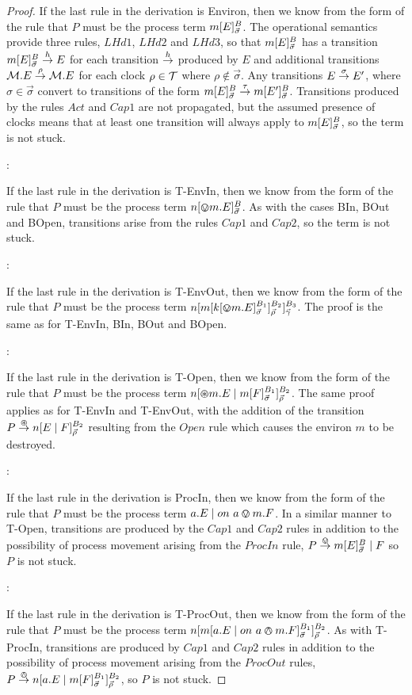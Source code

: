 \begin{proof}
\noindent If the last rule in the derivation is Environ, then we know
from the form of the rule that $P$ must be the process term
${m}[ E ]^{B}_{\vec{\sigma}}$.  The operational semantics provide
three rules, $LHd1$, $LHd2$ and $LHd3$, so that
${m}[ E ]^{B}_{\vec{\sigma}}$ has a transition
${m}[ E ]^{B}_{\vec{\sigma}} \stackrel{h}{\rightarrow} E$ for each transition
$\stackrel{h}{\rightarrow}$ produced by $E$ and additional transitions $\text{$\mathcal{M}$}.E
\stackrel{\rho}{\rightarrow} \text{$\mathcal{M}$}.E$ for each clock $\rho \in \text{$\mathcal{T}$}$ where $\rho
\not \in \vec{\sigma}$.  Any transitions $E \stackrel{\sigma}{\rightarrow} E'$,
where $\sigma \in \vec{\sigma}$ convert to transitions of the form
${m}[ E ]^{B}_{\vec{\sigma}} \stackrel{\tau}{\rightarrow}
{m}[ E' ]^{B}_{\vec{\sigma}}$.  Transitions produced by the rules
$Act$ and $Cap1$ are not propagated, but the assumed presence of
clocks means that at least one transition will always apply to
${m}[ E ]^{B}_{\vec{\sigma}}$, so the term is not stuck.

:

\noindent If the last rule in the derivation is T-EnvIn, then we know
from the form of the rule that $P$ must be the process term
${n}[ \varovee m.E ]^{B}_{\vec{\sigma}}$.  As with the cases BIn, BOut
and BOpen, transitions arise from the rules $Cap1$ and $Cap2$, so the
term is not stuck.

:

\noindent If the last rule in the derivation is T-EnvOut, then we know
from the form of the rule that $P$ must be the process term
${n}[ {m}[ {k}[ \varovee m.E ]^{B_1}_{\vec{\sigma}} ]^{B_2}_{\vec{\rho}} ]^{B_3}_{\vec{\gamma}}$.
The proof is the same as for T-EnvIn, BIn, BOut and BOpen.

:

\noindent If the last rule in the derivation is T-Open, then we know
from the form of the rule that $P$ must be the process term
${n}[ \varoast m.E \;|\;
  {m}[ F ]^{B_1}_{\vec{\sigma}} ]^{B_2}_{\vec{\rho}}$.  The same proof
applies as for T-EnvIn and T-EnvOut, with the addition of the
transition $P \stackrel{\varoast}{\rightarrow} {n}[ E \;|\; F ]^{B_2}_{\vec{\rho}}$
resulting from the $Open$ rule which causes the environ $m$ to be
destroyed.

:

\noindent If the last rule in the derivation is ProcIn, then we know
from the form of the rule that $P$ must be the process term $a.E \;|\;
on\ a \varovee m.F$.  In a similar manner to T-Open, transitions are
produced by the $Cap1$ and $Cap2$ rules in addition to the possibility
of process movement arising from the $ProcIn$ rule, $P \stackrel{\varovee}{\rightarrow}
{m}[ E ]^{B}_{\vec{\sigma}} \;|\; F$ so $P$ is not stuck.

:

\noindent If the last rule in the derivation is T-ProcOut, then we
know from the form of the rule that $P$ must be the process term
${n}[ {m}[ a.E \;|\;
    on\ a \varowedge m.F ]^{B_1}_{\vec{\sigma}} ]^{B_2}_{\vec{\rho}}$.  As with
T-ProcIn, transitions are produced by $Cap1$ and $Cap2$ rules in
addition to the possibility of process movement arising from the
$ProcOut$ rules, $P \stackrel{\varowedge}{\rightarrow} {n}[ a.E \;|\;
  {m}[ F ]^{B_1}_{\vec{\sigma}} ]^{B_2}_{\vec{\rho}}$, so $P$ is not stuck.
\end{proof}
